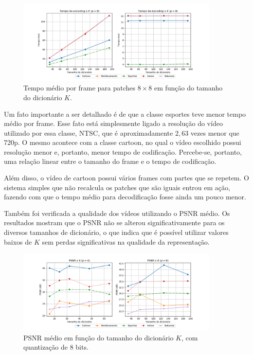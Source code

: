 \documentclass[cic,tc]{iiufrgs}
\begin{document}
\begin{figure}[H]
    \caption{Tempo médio por frame para patches $8\times8$ em função do tamanho do dicionário $K$.}
    \begin{center}
        \includegraphics[width=0.9\textwidth]{img/graficos/p8_ds_edtime.png}
    \end{center}
    \label{fig:timep8}
\end{figure}

Um fato importante a ser detalhado é de que a classe esportes teve menor tempo médio por frame.
Esse fato está simplesmente ligado a resolução do vídeo utilizado por essa classe, NTSC, que é 
aproximadamente $2,63$ vezes menor que 720p.
O mesmo acontece com a classe cartoon, no qual o vídeo escolhido possui resolução menor e, portanto,
menor tempo de codificação.
Percebe-se, portanto, uma relação linear entre o tamanho do frame e o tempo de codificação.

Além disso, o vídeo de cartoon possui vários frames com partes que se repetem.
O sistema simples que não recalcula os patches que são iguais entrou em ação, fazendo com que 
o tempo médio para decodificação fosse ainda um pouco menor.

Também foi verificada a qualidade dos vídeos utilizando o PSNR médio. 
Os resultados mostram que o PSNR não se alterou significativamente para os diversos tamanhos
de dicionário, o que indica que é possível utilizar valores baixos de $K$ sem perdas significativas
na qualidade da representação.

\begin{figure}[H]
    \caption{PSNR médio em função do tamanho do dicionário $K$, com quantização de 8 bits.}
    \begin{center}
        \includegraphics[width=0.9\textwidth]{img/graficos/ds_psnr.png}
    \end{center}
    \label{fig:psnr8bit}
\end{figure}
\end{document}
